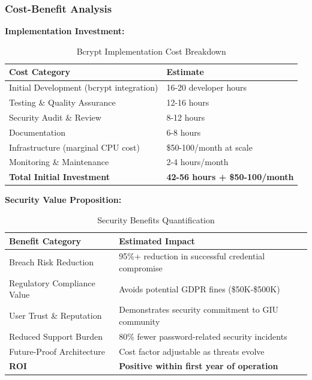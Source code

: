 \documentclass[12pt,a4paper]{article}
\begin{document}
\begin{tcolorbox}[colback=primaryblue!5, colframe=primaryblue, boxrule=1pt, arc=3pt, left=10pt, right=10pt, top=8pt, bottom=8pt]
\subsubsection{Cost-Benefit Analysis}

\textbf{Implementation Investment:}

\begin{table}[H]
\centering
\begin{tabular}{|p{6cm}|p{6cm}|}
\hline
\textbf{Cost Category} & \textbf{Estimate} \\
\hline
Initial Development (bcrypt integration) & 16-20 developer hours \\
\hline
Testing \& Quality Assurance & 12-16 hours \\
\hline
Security Audit \& Review & 8-12 hours \\
\hline
Documentation & 6-8 hours \\
\hline
Infrastructure (marginal CPU cost) & \$50-100/month at scale \\
\hline
Monitoring \& Maintenance & 2-4 hours/month \\
\hline
\textbf{Total Initial Investment} & \textbf{42-56 hours + \$50-100/month} \\
\hline
\end{tabular}
\caption{Bcrypt Implementation Cost Breakdown}
\end{table}

\vspace{0.5em}

\textbf{Security Value Proposition:}

\begin{table}[H]
\centering
\begin{tabular}{|p{6cm}|p{6cm}|}
\hline
\textbf{Benefit Category} & \textbf{Estimated Impact} \\
\hline
Breach Risk Reduction & 95\%+ reduction in successful credential compromise \\
\hline
Regulatory Compliance Value & Avoids potential GDPR fines (\$50K-\$500K) \\
\hline
User Trust \& Reputation & Demonstrates security commitment to GIU community \\
\hline
Reduced Support Burden & 80\% fewer password-related security incidents \\
\hline
Future-Proof Architecture & Cost factor adjustable as threats evolve \\
\hline
\textbf{ROI} & \textbf{Positive within first year of operation} \\
\hline
\end{tabular}
\caption{Security Benefits Quantification}
\end{table}


\end{tcolorbox}
\end{document}
